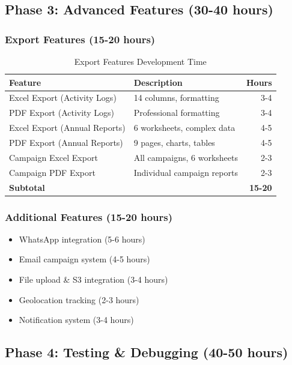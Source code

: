 \documentclass[11pt,a4paper]{article}
\begin{document}
\newpage

\subsection{Phase 3: Advanced Features (30-40 hours)}

\subsubsection{Export Features (15-20 hours)}
\begin{table}[h]
\centering
\begin{tabular}{llr}
\toprule
\textbf{Feature} & \textbf{Description} & \textbf{Hours} \\
\midrule
Excel Export (Activity Logs) & 14 columns, formatting & 3-4 \\
PDF Export (Activity Logs) & Professional formatting & 3-4 \\
Excel Export (Annual Reports) & 6 worksheets, complex data & 4-5 \\
PDF Export (Annual Reports) & 9 pages, charts, tables & 4-5 \\
Campaign Excel Export & All campaigns, 6 worksheets & 2-3 \\
Campaign PDF Export & Individual campaign reports & 2-3 \\
\bottomrule
\textbf{Subtotal} & & \textbf{15-20} \\
\bottomrule
\end{tabular}
\caption{Export Features Development Time}
\end{table}

\subsubsection{Additional Features (15-20 hours)}
\begin{itemize}
    \item WhatsApp integration (5-6 hours)
    \item Email campaign system (4-5 hours)
    \item File upload \& S3 integration (3-4 hours)
    \item Geolocation tracking (2-3 hours)
    \item Notification system (3-4 hours)
\end{itemize}

\newpage

\subsection{Phase 4: Testing \& Debugging (40-50 hours)}
\end{document}
